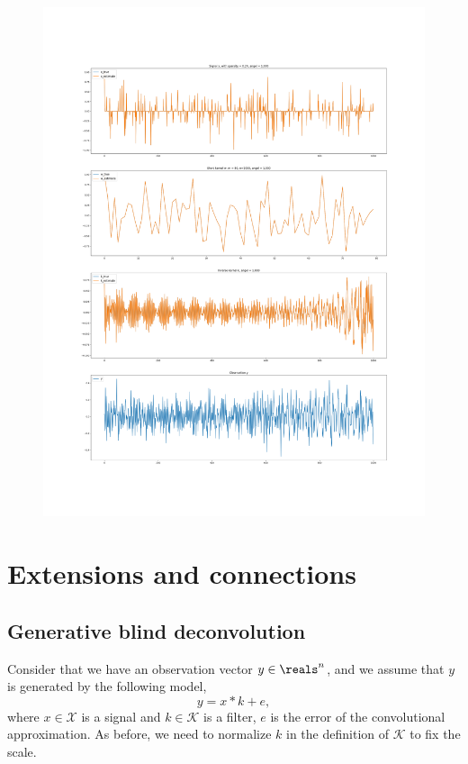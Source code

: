 \documentclass[12pt]{article}
\begin{document}
\begin{figure}
  \includegraphics[width=17cm,keepaspectratio]{fig5/bShort_lenKnown_xSparse_w_Gaus_Ano_n1000_k80_p0_24_sigma0_00.png}
\end{figure}
 
\section{Extensions and connections}
\subsection{Generative blind deconvolution }
Consider that we have an observation vector $y\in \reals^n$, and we assume that $y$ is generated by the following model,
$$y=x*k + e,$$
where $x\in \mathcal X$ is a signal and $k\in \mathcal K$ is a filter, $e$ is the error of the convolutional approximation. As before, we need to normalize $k$ in the definition of $\mathcal K$ to fix the scale.
\end{document}
